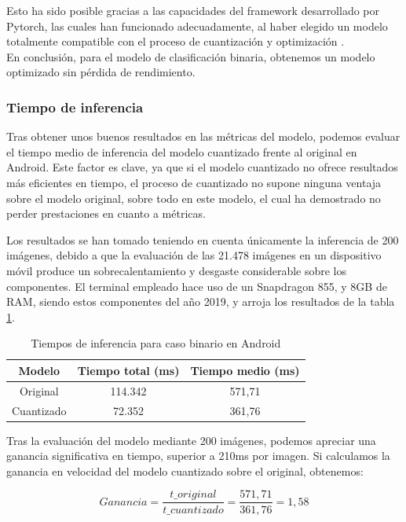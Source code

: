 Esto ha sido posible gracias a las capacidades del framework desarrollado por Pytorch, las cuales han funcionado adecuadamente, al haber elegido un modelo totalmente compatible con el proceso de cuantización y optimización \cite{comptquant}.\\

En conclusión, para el modelo de clasificación binaria, obtenemos un modelo optimizado sin pérdida de rendimiento.

\subsubsection{Tiempo de inferencia}

Tras obtener unos buenos resultados en las métricas del modelo, podemos evaluar el tiempo medio de inferencia del modelo cuantizado frente al original en Android. Este factor es clave, ya que si el modelo cuantizado no ofrece resultados más eficientes en tiempo, el proceso de cuantizado no supone ninguna ventaja sobre el modelo original, sobre todo en este modelo, el cual ha demostrado no perder prestaciones en cuanto a métricas.

Los resultados se han tomado teniendo en cuenta únicamente la inferencia de 200 imágenes, debido a que la evaluación de las 21.478 imágenes en un dispositivo móvil produce un sobrecalentamiento y desgaste considerable sobre los componentes. El terminal empleado hace uso de un Snapdragon 855, y 8GB de RAM, siendo estos componentes del año 2019, y arroja los resultados de la tabla \ref{infbintmp}.

\begin{table}[H]
	\centering
	\begin{tabular}{|c|c|c|}
		\hline
		Modelo & Tiempo total (ms) & Tiempo medio (ms) \\ \hline
		Original & 114.342 & 571,71 \\ \hline
		Cuantizado & 72.352 & 361,76 \\ \hline
	\end{tabular}
	\caption{Tiempos de inferencia para caso binario en Android}
	\label{infbintmp}
\end{table}

Tras la evaluación del modelo mediante 200 imágenes, podemos apreciar una ganancia significativa en tiempo, superior a 210ms por imagen. Si calculamos la ganancia en velocidad del modelo cuantizado sobre el original, obtenemos:

$$Ganancia = \frac{t\_original}{t\_cuantizado} = \frac{571,71}{361,76} = 1,58$$

